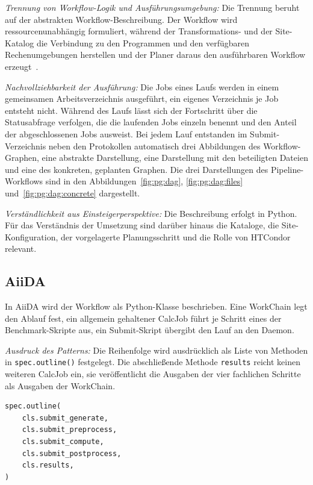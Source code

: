 \emph{Trennung von Workflow-Logik und Ausführungsumgebung:} Die
Trennung beruht auf der abstrakten Workflow-Beschreibung. Der
Workflow wird ressourcenunabhängig formuliert, während der
Transformations- und der Site-Katalog die Verbindung zu den
Programmen und den verfügbaren Rechenumgebungen herstellen und der
Planer daraus den ausführbaren Workflow
erzeugt~\cite[S.~18--20]{deelman2015pegasus}.


\emph{Nachvollziehbarkeit der Ausführung:} Die Jobs eines Laufs
werden in einem gemeinsamen Arbeitsverzeichnis ausgeführt, ein
eigenes Verzeichnis je Job entsteht nicht. Während des Laufs lässt
sich der Fortschritt über die Statusabfrage verfolgen, die die
laufenden Jobs einzeln benennt und den Anteil der abgeschlossenen
Jobs ausweist. Bei jedem Lauf entstanden
im Submit-Verzeichnis neben den Protokollen automatisch drei
Abbildungen des Workflow-Graphen, eine abstrakte Darstellung, eine
Darstellung mit den beteiligten Dateien und eine des konkreten,
geplanten Graphen. Die drei Darstellungen des
Pipeline-Workflows sind in den Abbildungen~\ref{fig:pg:dag},
\ref{fig:pg:dag:files} und~\ref{fig:pg:dag:concrete} dargestellt.

\emph{Verständlichkeit aus Einsteigerperspektive:} Die Beschreibung
erfolgt in Python. Für das Verständnis der Umsetzung sind darüber
hinaus die Kataloge, die Site-Konfiguration, der vorgelagerte
Planungsschritt und die Rolle von HTCondor relevant.

\subsection{AiiDA}
\label{sec:lokal:pipeline:aiida}

In AiiDA wird der Workflow als Python-Klasse beschrieben. Eine
WorkChain legt den Ablauf fest, ein allgemein gehaltener CalcJob
führt je Schritt eines der Benchmark-Skripte aus, ein Submit-Skript
übergibt den Lauf an den Daemon.

\emph{Ausdruck des Patterns:} Die Reihenfolge wird ausdrücklich als
Liste von Methoden in \texttt{spec.outline()} festgelegt. Die
abschließende Methode \texttt{results} reicht keinen weiteren
CalcJob ein, sie veröffentlicht die Ausgaben der vier fachlichen
Schritte als Ausgaben der WorkChain.

\begin{lstlisting}[language=Python,caption={Reihenfolge in spec.outline() (AiiDA, Pipeline)},label={lst:pipe:ai}]
spec.outline(
    cls.submit_generate,
    cls.submit_preprocess,
    cls.submit_compute,
    cls.submit_postprocess,
    cls.results,
)
\end{lstlisting}

